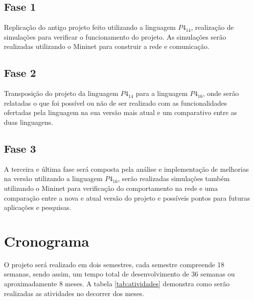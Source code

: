 \documentclass[12pt,
openright, 
oneside,
a4paper,
brazil]{facom-ufu-abntex2}
\theoremstyle{definition}
\begin{document}
\subsection{Fase 1}
Replicação do antigo projeto feito utilizando a linguagem $P4_{14}$, realização de simulações
para verificar o funcionamento do projeto. As simulações serão realizadas utilizando o
Mininet para construir a rede e comunicação.

\subsection{Fase 2}
Transposição do projeto da linguagem $P4_{14}$ para a linguagem $P4_{16}$, onde serão relatadas
o que foi possível ou não de ser realizado com as funcionalidades ofertadas pela linguagem na
sua versão mais atual e um comparativo entre as duas linguagens.

\subsection{Fase 3}
A terceira e última fase será composta pela análise e implementação de melhorias na versão
utilizando a linguagem $P4_{16}$, serão realizadas simulações também utilizando o Mininet
para verificação do comportamento na rede e uma comparação entre a nova e atual versão do
projeto e possíveis pontos para futuras aplicações e pesquisas.

\section{Cronograma}
O projeto será realizado em dois semestres, cada semestre compreende 18 semanas, sendo assim,
um tempo total de desenvolvimento de 36 semanas ou aproximadamente 8 meses. A tabela 
\ref{tab:atividades} demonstra como serão realizadas as atividades no decorrer dos meses.
\end{document}
